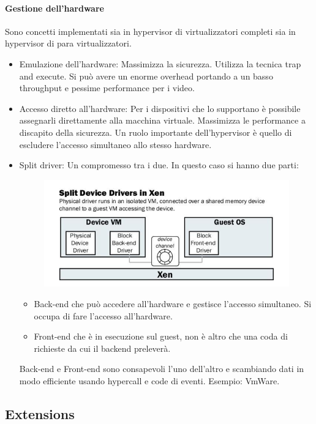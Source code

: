 \documentclass{article}
\begin{document}
		\paragraph{Gestione dell'hardware}
		Sono concetti implementati sia in hypervisor di virtualizzatori completi sia in hypervisor di para virtualizzatori.
		\begin{itemize}
		    \item Emulazione dell'hardware: Massimizza la sicurezza. Utilizza la tecnica trap and execute. Si può avere un enorme overhead portando a un basso throughput e pessime performance per i video. 
		    \item Accesso diretto all'hardware: Per i dispositivi che lo supportano è possibile assegnarli direttamente alla macchina virtuale. Massimizza le performance a discapito della sicurezza. Un ruolo importante dell'hypervisor è quello di escludere l'accesso simultaneo allo stesso hardware.
		    \item Split driver: Un compromesso tra i due. In questo caso si hanno due parti:
		    \begin{figure}[ht]
		    	\centering
		    	\includegraphics[width=0.7\linewidth]{images/SAC_B1_splitdriver}
		    	\label{fig:sacb1splitdriver}
		    \end{figure}
		    \begin{itemize}
		        \item Back-end che può accedere all'hardware e gestisce l'accesso simultaneo. Si occupa di fare l'accesso all'hardware.
		        \item Front-end che è in esecuzione sul guest, non è altro che una coda di richieste da cui il backend preleverà.
		    \end{itemize}
		    
		    Back-end e Front-end sono consapevoli l'uno dell'altro e scambiando dati in modo efficiente usando hypercall e code di eventi.
		    Esempio: VmWare.
		\end{itemize}
		
		\subsection{Extensions}
\end{document}
